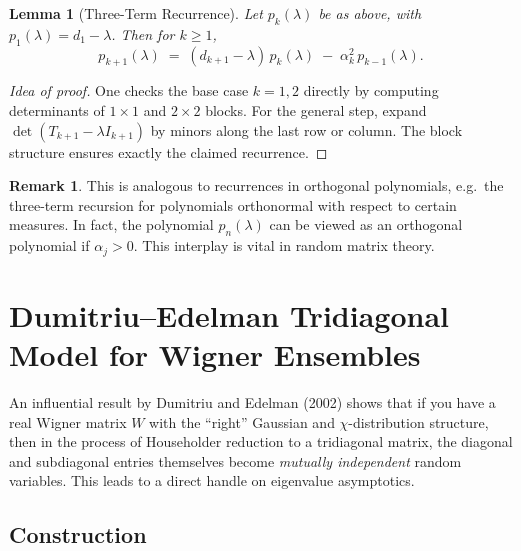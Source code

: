 \documentclass[letterpaper,11pt,oneside,reqno]{article}
\numberwithin{equation}{section}
\newtheorem{lemma}[proposition]{Lemma}
\theoremstyle{definition}
\newtheorem{remark}[proposition]{Remark}
\begin{document}
\begin{lemma}[Three-Term Recurrence]
\label{lem:3term-recurrence}
Let $p_k(\lambda)$ be as above, with $p_1(\lambda) = d_1 - \lambda$. Then for $k \ge 1$,
\[
  p_{k+1}(\lambda)
  \;=\;
  (d_{k+1} - \lambda)\,p_k(\lambda)
  \;-\;\alpha_k^2\,p_{k-1}(\lambda).
\]
\end{lemma}

\begin{proof}[Idea of proof]
One checks the base case $k=1,2$ directly by computing determinants of $1\times1$ and $2\times2$ blocks. For the general step, expand $\det(T_{k+1}-\lambda I_{k+1})$ by minors along the last row or column. The block structure ensures exactly the claimed recurrence.
\end{proof}

\begin{remark}
This is analogous to recurrences in orthogonal polynomials, e.g.\ the three-term recursion for polynomials orthonormal with respect to certain measures. In fact, the polynomial $p_n(\lambda)$ can be viewed as an orthogonal polynomial if $\alpha_j>0$. This interplay is vital in random matrix theory.
\end{remark}

\section{Dumitriu--Edelman Tridiagonal Model for Wigner Ensembles}
\label{sec:dumitriu-edelman}

An influential result by Dumitriu and Edelman (2002) shows that if you have a real Wigner matrix $W$ with the “right” Gaussian and $\chi$-distribution structure, then in the process of Householder reduction to a tridiagonal matrix, the diagonal and subdiagonal entries themselves become \emph{mutually independent} random variables. This leads to a direct handle on eigenvalue asymptotics.

\subsection{Construction}
\end{document}
